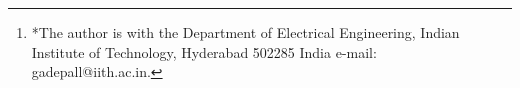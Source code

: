 \documentclass[journal,12pt,twocolumn]{IEEEtran}
\begin{document}
\author{G V V Sharma$^{*}$ %
\thanks{*The author is with the Department
of Electrical Engineering, Indian Institute of Technology, Hyderabad
502285 India e-mail:  gadepall@iith.ac.in.}%
}
% 
%



% 







\maketitle
\end{document}
